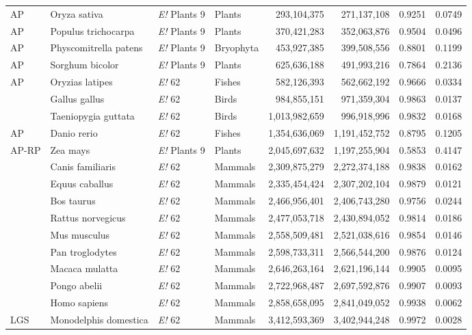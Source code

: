 \begin{FPtable}
{\begin{tabular}{ l l p{62pt} l r r r r }
AP & Oryza sativa & {\it E!} Plants 9 & Plants & 293,104,375 & 271,137,108 & 0.9251 & 0.0749 \\
AP & Populus trichocarpa & {\it E!} Plants 9 & Plants & 370,421,283 & 352,063,876 & 0.9504 & 0.0496 \\
AP & Physcomitrella patens & {\it E!} Plants 9 & Bryophyta & 453,927,385 & 399,508,556 & 0.8801 & 0.1199 \\
AP & Sorghum bicolor & {\it E!} Plants 9 & Plants & 625,636,188 & 491,993,216 & 0.7864 & 0.2136 \\
AP & Oryzias latipes & {\it E!} 62 & Fishes & 582,126,393 & 562,662,192 & 0.9666 & 0.0334 \\
 & Gallus gallus & {\it E!} 62 & Birds & 984,855,151 & 971,359,304 & 0.9863 & 0.0137 \\
 & Taeniopygia guttata & {\it E!} 62 & Birds & 1,013,982,659 & 996,918,996 & 0.9832 & 0.0168 \\
AP & Danio rerio & {\it E!} 62 & Fishes & 1,354,636,069 & 1,191,452,752 & 0.8795 & 0.1205 \\
AP-RP & Zea mays & {\it E!} Plants 9 & Plants & 2,045,697,632 & 1,197,255,904 & 0.5853 & 0.4147 \\
 & Canis familiaris & {\it E!} 62 & Mammals & 2,309,875,279 & 2,272,374,188 & 0.9838 & 0.0162 \\
 & Equus caballus & {\it E!} 62 & Mammals & 2,335,454,424 & 2,307,202,104 & 0.9879 & 0.0121 \\
 & Bos taurus & {\it E!} 62 & Mammals & 2,466,956,401 & 2,406,743,280 & 0.9756 & 0.0244 \\
 & Rattus norvegicus & {\it E!} 62 & Mammals & 2,477,053,718 & 2,430,894,052 & 0.9814 & 0.0186 \\
 & Mus musculus & {\it E!} 62 & Mammals & 2,558,509,481 & 2,521,038,616 & 0.9854 & 0.0146 \\
 & Pan troglodytes & {\it E!} 62 & Mammals & 2,598,733,311 & 2,566,544,200 & 0.9876 & 0.0124 \\
 & Macaca mulatta & {\it E!} 62 & Mammals & 2,646,263,164 & 2,621,196,144 & 0.9905 & 0.0095 \\
 & Pongo abelii & {\it E!} 62 & Mammals & 2,722,968,487 & 2,697,592,876 & 0.9907 & 0.0093 \\
 & Homo sapiens & {\it E!} 62 & Mammals & 2,858,658,095 &
 2,841,049,052 & 0.9938 & 0.0062 \\
LGS & Monodelphis domestica & {\it E!} 62 & Mammals & 3,412,593,369 & 3,402,944,248 & 0.9972 & 0.0028 \\ \hline
  \end{tabular}
}
\end{FPtable}
